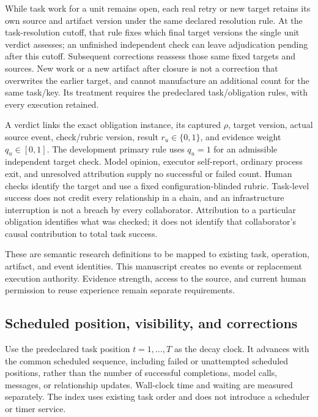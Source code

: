 \documentclass[
  english,
  11pt,
]{article}
\begin{document}
While task work for a unit remains open, each real retry or new target
retains its own source and artifact version under the same declared
resolution rule. At the task-resolution cutoff, that rule fixes which
final target versions the single unit verdict assesses; an unfinished
independent check can leave adjudication pending after this cutoff.
Subsequent corrections reassess those same fixed targets and sources.
New work or a new artifact after closure is not a correction that
overwrites the earlier target, and cannot manufacture an additional
count for the same task/key. Its treatment requires the predeclared
task/obligation rules, with every execution retained.

A verdict links the exact obligation instance, its captured \(\rho\),
target version, actual source event, check/rubric version, result
\(r_u\in\{0,1\}\), and evidence weight \(q_u\in[0,1]\). The development
primary rule uses \(q_u=1\) for an admissible independent target check.
Model opinion, executor self-report, ordinary process exit, and
unresolved attribution supply no successful or failed count. Human
checks identify the target and use a fixed configuration-blinded rubric.
Task-level success does not credit every relationship in a chain, and an
infrastructure interruption is not a breach by every collaborator.
Attribution to a particular obligation identifies what was checked; it
does not identify that collaborator's causal contribution to total task
success.

These are semantic research definitions to be mapped to existing task,
operation, artifact, and event identities. This manuscript creates no
events or replacement execution authority. Evidence strength, access to
the source, and current human permission to reuse experience remain
separate requirements.

\subsection{Scheduled position, visibility, and
corrections}\label{scheduled-position-visibility-and-corrections}

Use the predeclared task position \(t=1,\ldots,T\) as the decay clock.
It advances with the common scheduled sequence, including failed or
unattempted scheduled positions, rather than the number of successful
completions, model calls, messages, or relationship updates. Wall-clock
time and waiting are measured separately. The index uses existing task
order and does not introduce a scheduler or timer service.
\end{document}
